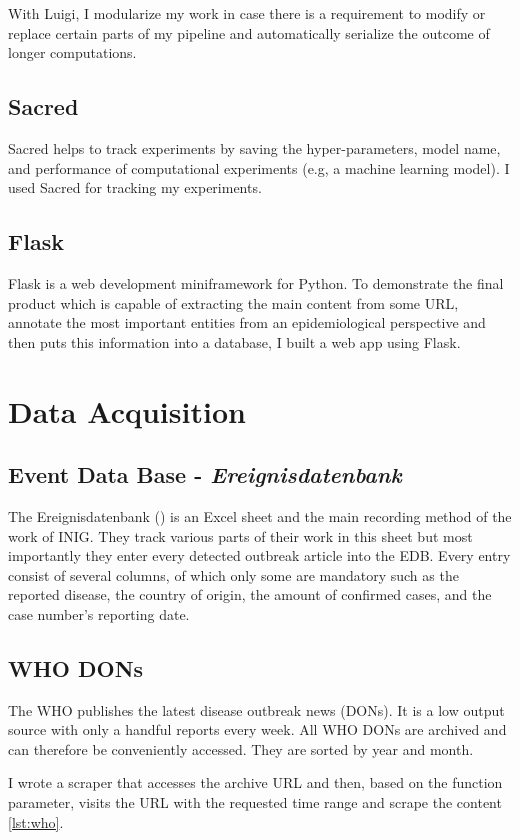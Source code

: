With Luigi, I modularize my work in case there is a requirement to modify or replace certain parts of my pipeline and automatically serialize the outcome of longer computations.

\subsection{Sacred}
Sacred helps to track experiments by saving the hyper-parameters, model name, and performance of computational experiments (e.g, a machine learning model).
I used Sacred for tracking my experiments.

\subsection{Flask}
Flask is a web development miniframework for Python.
To demonstrate the final product which is capable of extracting the main content from some URL, annotate the most important entities from an epidemiological perspective and then puts this information into a database, I built a web app using Flask.

\section{Data Acquisition}
\subsection{Event Data Base - \textit{Ereignisdatenbank}}
The Ereignisdatenbank () is an Excel sheet and the main recording method of the work of INIG. They track various parts of their work in this sheet but most importantly they enter every detected outbreak article into the EDB. Every entry consist of several columns, of which only some are mandatory such as the reported disease, the country of origin, the amount of confirmed cases, and the case number's reporting date.

\subsection{WHO DONs}
The WHO publishes the latest disease outbreak news (DONs).
It is a low output source with only a handful reports every week.
All WHO DONs are archived and can therefore be conveniently accessed.
They are sorted by year and month.

I wrote a scraper that accesses the archive URL and then, based on the function parameter, visits the URL with the requested time range and scrape the content \ref{lst:who}.

